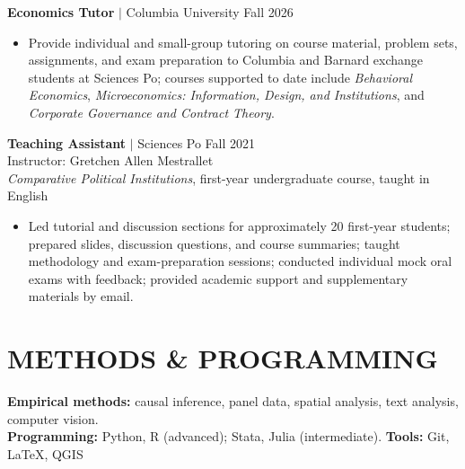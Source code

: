 \documentclass[a4paper,11pt]{article}
\begin{document}
\normalsize{\textbf{Economics Tutor} $|$ Columbia University \hfill Fall 2026
\small{\begin{itemize}[itemsep=-0.1em, before=\vspace{-1em}, after=\vspace{-0.25em}]
    \item Provide individual and small-group tutoring on course material, problem sets, assignments, and exam preparation to Columbia and Barnard exchange students at Sciences Po; courses supported to date include \emph{Behavioral Economics}, \emph{Microeconomics: Information, Design, and Institutions}, and \emph{Corporate Governance and Contract Theory}.
\end{itemize}}

\normalsize{\textbf{Teaching Assistant} $|$ Sciences Po \hfill Fall 2021 \\
Instructor: Gretchen Allen Mestrallet \\
\emph{Comparative Political Institutions}, first-year undergraduate course, taught in English}
\small{\begin{itemize}[itemsep=-0.1em, before=\vspace{-1em}, after=\vspace{-0.25em}]
    \item Led tutorial and discussion sections for approximately 20 first-year students; prepared slides, discussion questions, and course summaries; taught methodology and exam-preparation sessions; conducted individual mock oral exams with feedback; provided academic support and supplementary materials by email.
\end{itemize}}


\section{METHODS \& PROGRAMMING}

\normalsize
\textbf{Empirical methods:} causal inference, panel data, spatial analysis, text analysis, computer vision. \\[-1.5em]

\textbf{Programming:} Python, R (advanced); Stata, Julia (intermediate). \hfill \textbf{Tools:} Git, \LaTeX, QGIS \\[-1.5em]

}
\end{document}
